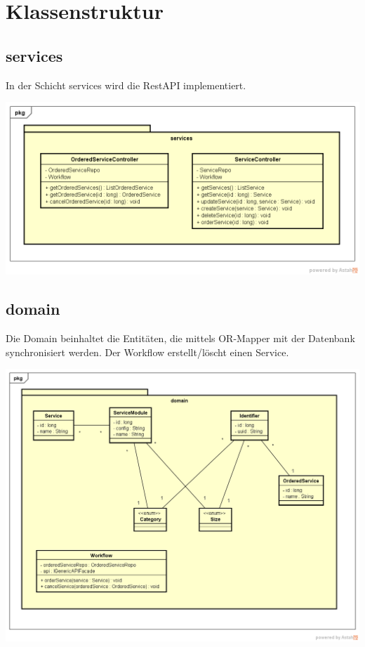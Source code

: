 \documentclass[11pt]{scrartcl}
\begin{document}
\newpage

\section{Klassenstruktur}

\subsection{services}

In der Schicht services wird die RestAPI implementiert.

\begin{center}
\includegraphics[scale=0.5]{services}
\end{center}

\subsection{domain}

Die Domain beinhaltet die Entitäten, die mittels OR-Mapper mit der Datenbank synchronisiert werden.
Der Workflow erstellt/löscht einen Service.

\begin{center}
\includegraphics[scale=0.5]{domain}
\end{center}
\end{document}
